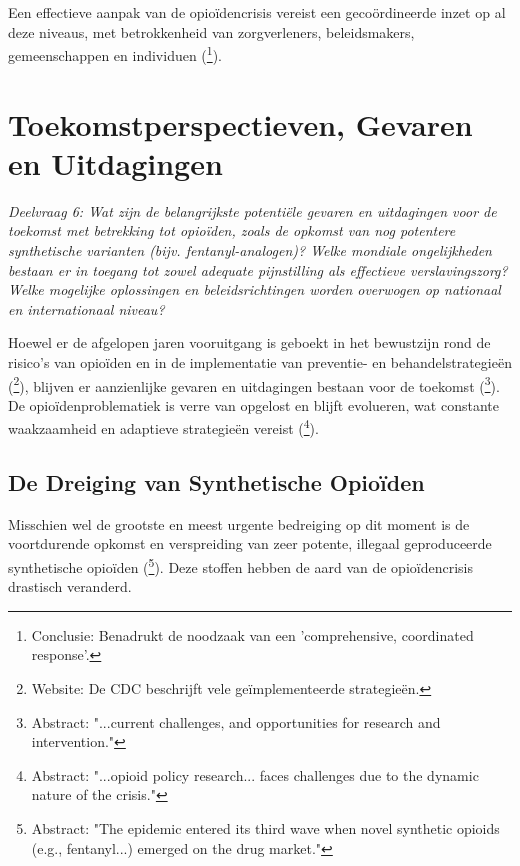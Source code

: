 \documentclass[11pt, a4paper]{report} %
\begin{document}
Een effectieve aanpak van de opioïdencrisis vereist een gecoördineerde inzet op al deze niveaus, met betrokkenheid van zorgverleners, beleidsmakers, gemeenschappen en individuen (\cite{Schuler2020StateScienceOpioidPolicy}\footnote{Conclusie: Benadrukt de noodzaak van een 'comprehensive, coordinated response'.}).
\chapter{Toekomstperspectieven, Gevaren en Uitdagingen}
\label{ch:toekomst}
\textit{Deelvraag 6: Wat zijn de belangrijkste potentiële gevaren en uitdagingen voor de toekomst met betrekking tot opioïden, zoals de opkomst van nog potentere synthetische varianten (bijv. fentanyl-analogen)? Welke mondiale ongelijkheden bestaan er in toegang tot zowel adequate pijnstilling als effectieve verslavingszorg? Welke mogelijke oplossingen en beleidsrichtingen worden overwogen op nationaal en internationaal niveau?}

Hoewel er de afgelopen jaren vooruitgang is geboekt in het bewustzijn rond de risico's van opioïden en in de implementatie van preventie- en behandelstrategieën (\cite{CDCPreventingOverdose}\footnote{Website: De CDC beschrijft vele geïmplementeerde strategieën.}), blijven er aanzienlijke gevaren en uitdagingen bestaan voor de toekomst (\cite{Volkow2021ChangingOpioidCrisis}\footnote{Abstract: "...current challenges, and opportunities for research and intervention."}). De opioïdenproblematiek is verre van opgelost en blijft evolueren, wat constante waakzaamheid en adaptieve strategieën vereist (\cite{Schuler2020StateScienceOpioidPolicy}\footnote{Abstract: "...opioid policy research... faces challenges due to the dynamic nature of the crisis."}).

\section{De Dreiging van Synthetische Opioïden}
Misschien wel de grootste en meest urgente bedreiging op dit moment is de voortdurende opkomst en verspreiding van zeer potente, illegaal geproduceerde synthetische opioïden (\cite{Ciccarone2019TripleWave}\footnote{Abstract: "The epidemic entered its third wave when novel synthetic opioids (e.g., fentanyl...) emerged on the drug market."}). Deze stoffen hebben de aard van de opioïdencrisis drastisch veranderd.
\end{document}
